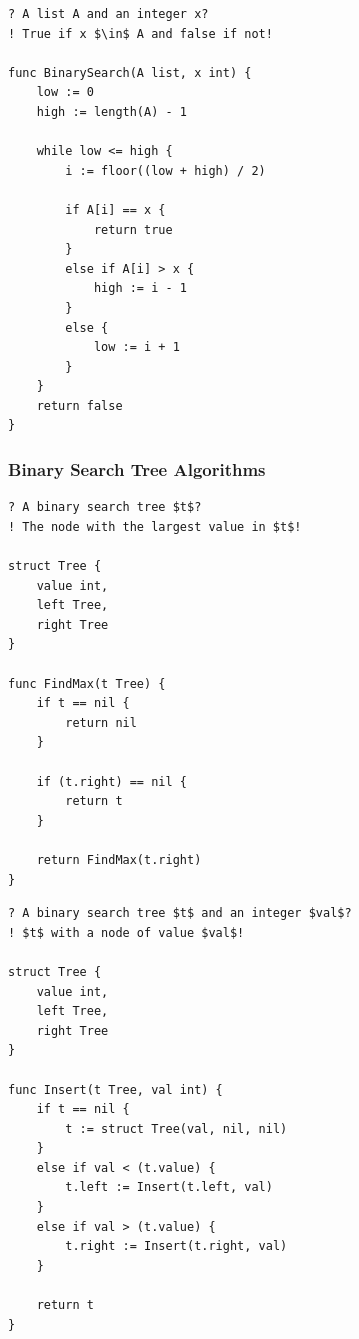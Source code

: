 \begin{lstlisting}[caption={Binary search implementation in Gourmet.}, captionpos=b, label={binarySearchGourmet}]
? A list A and an integer x?
! True if x $\in$ A and false if not!

func BinarySearch(A list, x int) {
    low := 0
    high := length(A) - 1

    while low <= high {
        i := floor((low + high) / 2)

        if A[i] == x {
            return true
        }
        else if A[i] > x {
            high := i - 1
        }
        else {
            low := i + 1
        }
    }
    return false
}
\end{lstlisting}

\newpage

\subsubsection{Binary Search Tree Algorithms}

\begin{lstlisting}[caption={Find max in BST implementation in Gourmet.}, captionpos=b, label={findMaxGourmet}]
? A binary search tree $t$?
! The node with the largest value in $t$!

struct Tree {
    value int,
    left Tree,
    right Tree
}

func FindMax(t Tree) {
    if t == nil {
        return nil
    }

    if (t.right) == nil {
        return t
    }

    return FindMax(t.right)
}
\end{lstlisting}

\begin{lstlisting}[caption={Insert in BST implementation in Gourmet.}, captionpos=b, label={insertGourmet}]
? A binary search tree $t$ and an integer $val$?
! $t$ with a node of value $val$!

struct Tree {
    value int,
    left Tree,
    right Tree
}

func Insert(t Tree, val int) {
    if t == nil {
        t := struct Tree(val, nil, nil)
    }
    else if val < (t.value) {
        t.left := Insert(t.left, val)
    }
    else if val > (t.value) {
        t.right := Insert(t.right, val)
    }

    return t
}
\end{lstlisting}

